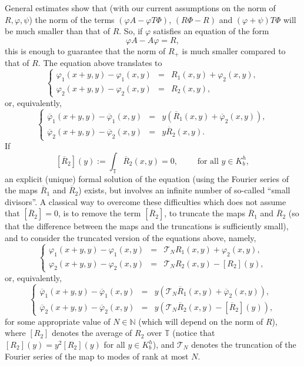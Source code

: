 \documentclass[10pt]{article}
\newcommand{\N}{\mathbb{N}}
\newcommand{\T}{\mathbb{T}}
\begin{document}
General estimates show that (with our current assumptions on the norm of $R, \varphi, \psi$) the norm of the terms $(\varphi A - \varphi T\Phi)$, $(R\Phi - R)$ and $(\varphi + \psi)T \Phi$ will be much smaller than that of $R$. So, if $\varphi$ satisfies an equation of the form
\[ \varphi A - A\varphi = R,\]
this is enough to guarantee that the norm of $R_+$ is much smaller compared to that of $R$. The equation above translates to
\begin{equation*}
 \left\{
 \begin{array}{rcl}
 \varphi_1(x+y,y) - \varphi_1(x,y) &=&  R_1(x, y) + \varphi_2(x,y),\\
 \varphi_2(x+y,y) - \varphi_2(x,y) &=&  R_2(x, y),
 \end{array}
 \right.
\end{equation*}
or, equivalently,
\begin{equation*}
 \left\{
 \begin{array}{rcl}
 \overline\varphi_1(x+y,y)-\overline\varphi_1(x,y) &=& y(\overline R_1(x, y) +\overline\varphi_2(x,y)),\\
 \overline\varphi_2(x+y,y)-\overline\varphi_2(x,y) &=& y\overline R_2(x, y).
 \end{array}
 \right.
\end{equation*}
If $$[\overline R_2](y):= \int_{\T} \overline R_2(x, y) = 0,  \qquad \text{ for all } y \in K^h_b,$$ an explicit (unique) formal solution of the equation (using the Fourier series of the maps $\overline R_1$ and $\overline R_2$) exists, but involves an infinite number of so-called ``small divisors''. A classical way to overcome these difficulties which does not assume that $[\overline R_2]=0$, is to remove the term $[\overline R_2]$, to truncate the maps $\overline R_1$ and $\overline R_2$ (so that the difference between the maps and the truncations is sufficiently small), and to consider the truncated version of the equations above, namely, 
\begin{equation}
\label{equation:multi_difference_equation_no_rescaling}
 \left\{
 \begin{array}{rcl}
 \varphi_1(x+y,y) - \varphi_1(x,y) &=&  \mathscr T_N R_1(x, y) + \varphi_2(x,y),\\
 \varphi_2(x+y,y) - \varphi_2(x,y) &=&  \mathscr T_N R_2(x, y) - [R_2](y),
 \end{array}
 \right.
\end{equation}
or, equivalently,
\begin{equation}
\label{equation:multi_difference_equation}
 \left\{
 \begin{array}{rcl}
 \overline\varphi_1(x+y,y)-\overline\varphi_1(x,y) &=& y(\mathscr T_N \overline R_1(x, y) +\overline\varphi_2(x,y)),\\
 \overline\varphi_2(x+y,y)-\overline\varphi_2(x,y) &=& y (\mathscr T_N \overline R_2(x, y) - [\overline R_2](y)),
 \end{array}
 \right.
\end{equation}
for some appropriate value of $N \in \N$ (which will depend on the norm of $R$),
where $[R_2]$ denotes the average of $R_2$ over $\T$ (notice that $[R_2](y) = y^2[R_2](y)$ for all $y \in K^h_b$), and $\mathscr T_N$ denotes the truncation of the Fourier series of the map to modes of rank at most $N$.
\end{document}
